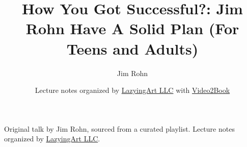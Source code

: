 \documentclass[11pt,oneside]{book}
\begin{document}
\frontmatter
\title{How You Got Successful?: Jim Rohn Have A Solid Plan (For Teens and Adults)}
\author{Jim Rohn}
\date{Lecture notes organized by \href{https://lazying.art}{LazyingArt LLC} with \href{https://github.com/lachlanchen/Video2Book}{Video2Book}}
\maketitle
\begin{center}
\small Original talk by Jim Rohn, sourced from a curated playlist. Lecture notes organized by \href{https://lazying.art}{LazyingArt LLC}.
\end{center}
\clearpage
\mainmatter

\end{document}
